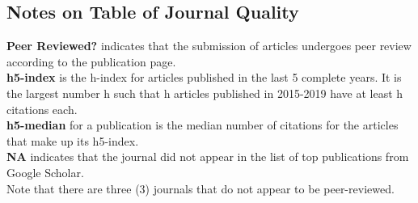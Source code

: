 \subsection{Notes on Table of Journal Quality}

{\bf Peer Reviewed?} indicates that the submission of articles undergoes peer review according to the publication page. \\

{\bf h5-index} is the h-index for articles published in the last 5 complete years. It is the largest number h such that h articles published in 2015-2019 have at least h citations each. \\

{\bf h5-median} for a publication is the median number of citations for the articles that make up its h5-index. \\

{\bf NA} indicates that the journal did not appear in the list of top publications from Google Scholar.\\

Note that there are three (3) journals that do not appear to be peer-reviewed. \\

